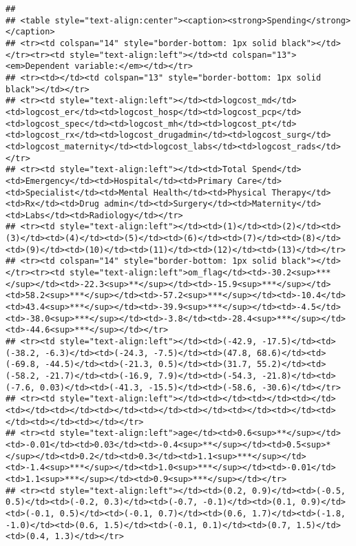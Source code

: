 \documentclass[]{article}
\begin{document}
\begin{verbatim}
## 
## <table style="text-align:center"><caption><strong>Spending</strong></caption>
## <tr><td colspan="14" style="border-bottom: 1px solid black"></td></tr><tr><td style="text-align:left"></td><td colspan="13"><em>Dependent variable:</em></td></tr>
## <tr><td></td><td colspan="13" style="border-bottom: 1px solid black"></td></tr>
## <tr><td style="text-align:left"></td><td>logcost_md</td><td>logcost_er</td><td>logcost_hosp</td><td>logcost_pcp</td><td>logcost_spec</td><td>logcost_mh</td><td>logcost_pt</td><td>logcost_rx</td><td>logcost_drugadmin</td><td>logcost_surg</td><td>logcost_maternity</td><td>logcost_labs</td><td>logcost_rads</td></tr>
## <tr><td style="text-align:left"></td><td>Total Spend</td><td>Emergency</td><td>Hospital</td><td>Primary Care</td><td>Specialist</td><td>Mental Health</td><td>Physical Therapy</td><td>Rx</td><td>Drug admin</td><td>Surgery</td><td>Maternity</td><td>Labs</td><td>Radiology</td></tr>
## <tr><td style="text-align:left"></td><td>(1)</td><td>(2)</td><td>(3)</td><td>(4)</td><td>(5)</td><td>(6)</td><td>(7)</td><td>(8)</td><td>(9)</td><td>(10)</td><td>(11)</td><td>(12)</td><td>(13)</td></tr>
## <tr><td colspan="14" style="border-bottom: 1px solid black"></td></tr><tr><td style="text-align:left">om_flag</td><td>-30.2<sup>***</sup></td><td>-22.3<sup>**</sup></td><td>-15.9<sup>***</sup></td><td>58.2<sup>***</sup></td><td>-57.2<sup>***</sup></td><td>-10.4</td><td>43.4<sup>***</sup></td><td>-39.9<sup>***</sup></td><td>-4.5</td><td>-38.0<sup>***</sup></td><td>-3.8</td><td>-28.4<sup>***</sup></td><td>-44.6<sup>***</sup></td></tr>
## <tr><td style="text-align:left"></td><td>(-42.9, -17.5)</td><td>(-38.2, -6.3)</td><td>(-24.3, -7.5)</td><td>(47.8, 68.6)</td><td>(-69.8, -44.5)</td><td>(-21.3, 0.5)</td><td>(31.7, 55.2)</td><td>(-58.2, -21.7)</td><td>(-16.9, 7.9)</td><td>(-54.3, -21.8)</td><td>(-7.6, 0.03)</td><td>(-41.3, -15.5)</td><td>(-58.6, -30.6)</td></tr>
## <tr><td style="text-align:left"></td><td></td><td></td><td></td><td></td><td></td><td></td><td></td><td></td><td></td><td></td><td></td><td></td><td></td></tr>
## <tr><td style="text-align:left">age</td><td>0.6<sup>**</sup></td><td>-0.01</td><td>0.03</td><td>-0.4<sup>**</sup></td><td>0.5<sup>*</sup></td><td>0.2</td><td>0.3</td><td>1.1<sup>***</sup></td><td>-1.4<sup>***</sup></td><td>1.0<sup>***</sup></td><td>-0.01</td><td>1.1<sup>***</sup></td><td>0.9<sup>***</sup></td></tr>
## <tr><td style="text-align:left"></td><td>(0.2, 0.9)</td><td>(-0.5, 0.5)</td><td>(-0.2, 0.3)</td><td>(-0.7, -0.1)</td><td>(0.1, 0.9)</td><td>(-0.1, 0.5)</td><td>(-0.1, 0.7)</td><td>(0.6, 1.7)</td><td>(-1.8, -1.0)</td><td>(0.6, 1.5)</td><td>(-0.1, 0.1)</td><td>(0.7, 1.5)</td><td>(0.4, 1.3)</td></tr>

\end{verbatim}
\end{document}
